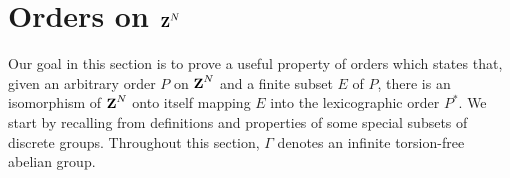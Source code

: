 \section{Orders on $\Z^N$}
\newtheorem{remarks}{Definition}[section]
\newtheorem{defn}[remarks]{Definition}
\newtheorem{rem1}[remarks]{Remark}
\newtheorem{def2}[remarks]{Definition}
\newtheorem{rem2}[remarks]{Remarks}
\newtheorem{lemma1}[remarks]{Theorem}
\newtheorem{pure}[remarks]{Proposition}
\newtheorem{lemma2}[remarks]{Lemma}
\newtheorem{theorem3}[remarks]{Theorem}
\newtheorem{theorem4}[remarks]{Theorem}
Our goal in this section
is to prove a useful property of orders
which states that, given an arbitrary order 
$P$ on 
$\Z^N$ and a finite subset 
$E$ of $P$, there is an isomorphism
of $\Z^N$ onto itself mapping $E$ into
the lexicographic order $P^*$.
  We start by recalling from \cite[Appendix A]{hr1}
definitions and properties of 
some special subsets of discrete groups.
Throughout this section, $\Gamma$
denotes an infinite torsion-free abelian group.

